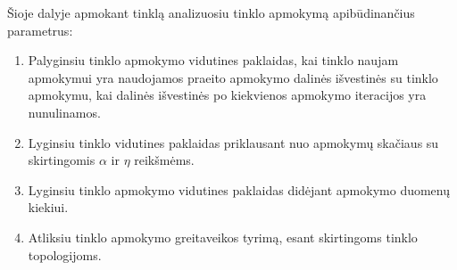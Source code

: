 Šioje dalyje apmokant tinklą analizuosiu tinklo apmokymą apibūdinančius parametrus:
\begin{enumerate}
  \item Palyginsiu tinklo apmokymo vidutines paklaidas, kai tinklo naujam apmokymui yra naudojamos praeito apmokymo dalinės išvestinės su tinklo apmokymu, kai dalinės išvestinės po kiekvienos apmokymo iteracijos yra nunulinamos.
  \item Lyginsiu tinklo vidutines paklaidas priklausant nuo apmokymų skačiaus su skirtingomis $\alpha$ ir $\eta$ reikšmėms.
  \item Lyginsiu tinklo apmokymo vidutines paklaidas didėjant apmokymo duomenų kiekiui.
  \item Atliksiu tinklo apmokymo greitaveikos tyrimą, esant skirtingoms tinklo topologijoms.
\end{enumerate}

